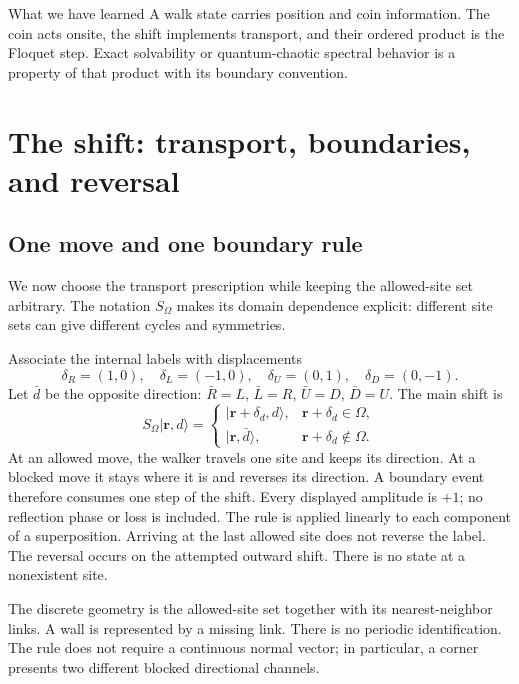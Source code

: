 \documentclass[11pt,a4paper,oneside]{report}
\newcommand{\ket}[1]{\lvert #1\rangle}
\numberwithin{equation}{chapter}
\begin{document}
\begin{lesson}{What we have learned}
A walk state carries position and coin information. The coin acts
onsite, the shift implements transport, and their ordered product is
the Floquet step. Exact solvability or quantum-chaotic spectral
behavior is a property of that product with its boundary convention.
\end{lesson}


\chapter{The shift: transport, boundaries, and reversal}
\label{ch:shift}

\section{One move and one boundary rule}

We now choose the transport prescription while keeping the allowed-site
set arbitrary. The notation \(S_\Omega\) makes its domain dependence
explicit: different site sets can give different cycles and symmetries.

Associate the internal labels with displacements
\[
\delta_R=(1,0),\quad \delta_L=(-1,0),\quad
\delta_U=(0,1),\quad \delta_D=(0,-1).
\]
Let \(\bar d\) be the opposite direction:
\(\bar R=L\), \(\bar L=R\), \(\bar U=D\), \(\bar D=U\).
The main shift is
\begin{equation}
\boxed{
S_\Omega\ket{\mathbf r,d}=
\begin{cases}
\ket{\mathbf r+\delta_d,d},&\mathbf r+\delta_d\in\Omega,\\
\ket{\mathbf r,\bar d},&\mathbf r+\delta_d\notin\Omega.
\end{cases}}
\label{eq:moving}
\end{equation}
At an allowed move, the walker travels one site and keeps its
direction. At a blocked move it stays where it is and reverses its
direction. A boundary event therefore consumes one step of the shift.
Every displayed amplitude is \(+1\); no reflection phase or loss is
included. The rule is applied linearly to each component of a superposition.
Arriving at the last allowed site does not reverse the label. The
reversal occurs on the attempted outward shift. There is no state at
a nonexistent site.

The discrete geometry is the allowed-site set together with its
nearest-neighbor links. A wall is represented by a missing link.
There is no periodic identification. The rule does not require a
continuous normal vector; in particular, a corner presents two
different blocked directional channels.
\end{document}
